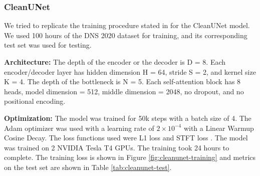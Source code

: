 \subsubsection{CleanUNet}
We tried to replicate the training procedure stated in \cite{kong2022} for the CleanUNet model. We used 100 hours of the DNS 2020 dataset \cite{reddy2020} for training, and its corresponding test set was used for testing.

\textbf{Architecture:} The depth of the encoder or the decoder is D = 8. Each encoder/decoder layer has hidden dimension H = 64, stride S = 2, and kernel size K = 4.
The depth of the bottleneck is N = 5. Each self-attention block has 8 heads, model dimension = 512, middle dimension = 2048, no dropout, and no positional encoding.

\textbf{Optimization:} The model was trained for 50k steps with a batch size of 4. The Adam \cite{kingma2017adam} optimizer was used with a learning rate of $2\times 10^{-4}$ with a Linear Warmup Cosine Decay. The loss functions used were L1 loss and STFT loss \cite{defossez2020}.
The model was trained on 2 NVIDIA Tesla T4 GPUs. The training took 24 hours to complete. The training loss is shown in Figure \ref{fig:cleanunet-training} and metrics on the test set are shown in Table \ref{tab:cleanunet-test}.

